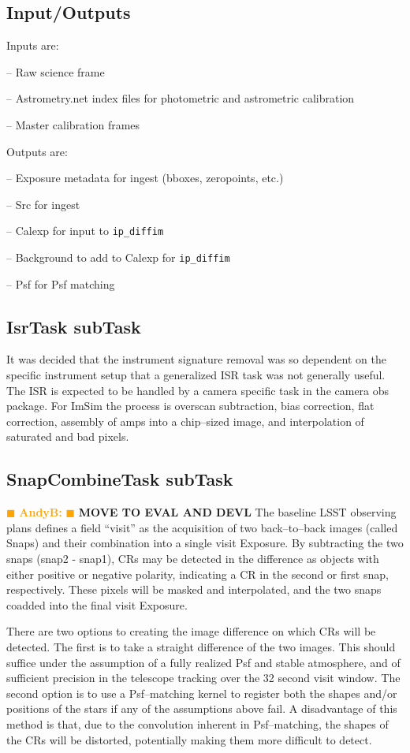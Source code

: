 \documentclass[prd, nofootinbib, floatfix, 11pt,tightenlines,times]{article}
\newcommand{\becker} { \textcolor{orange} {
\ensuremath{\blacksquare} {\bf AndyB:}  
\ensuremath{\blacksquare} } }
\begin{document}
\subsection{Input/Outputs}
Inputs are:

-- Raw science frame

-- Astrometry.net index files for photometric and astrometric calibration

-- Master calibration frames



Outputs are:

-- Exposure metadata for ingest (bboxes, zeropoints, etc.)

-- Src for ingest

-- Calexp for input to {\tt ip\_diffim}

-- Background to add to Calexp for {\tt ip\_diffim}

-- Psf for Psf matching

\subsection{IsrTask subTask}
It was decided that the instrument signature removal was so dependent on the specific instrument setup that a generalized
ISR task was not generally useful.  The ISR is expected to be handled by a camera specific task in the camera obs package.  
For ImSim the process is overscan subtraction, bias correction, flat correction, assembly of amps into a chip--sized image, 
and interpolation of saturated and bad pixels.

\subsection{SnapCombineTask subTask} \becker
{\bf MOVE TO EVAL AND DEVL}
The baseline LSST observing plans defines a field ``visit'' as the
acquisition of two back--to--back images (called Snaps) and their
combination into a single visit Exposure.  By subtracting the two snaps
(snap2 - snap1), CRs may be detected in the difference as objects with
either positive or negative polarity, indicating a CR in the second or
first snap, respectively.  These pixels will be masked and
interpolated, and the two snaps coadded into the final visit Exposure.


There are two options to creating the image difference on which CRs
will be detected.  The first is to take a straight difference of the
two images.  This should suffice under the assumption of a fully
realized Psf and stable atmosphere, and of sufficient precision in the
telescope tracking over the 32 second visit window.  The second option
is to use a Psf--matching kernel to register both the shapes and/or
positions of the stars if any of the assumptions above fail.  A
disadvantage of this method is that, due to the convolution inherent
in Psf--matching, the shapes of the CRs will be distorted, potentially
making them more difficult to detect.
\end{document}
